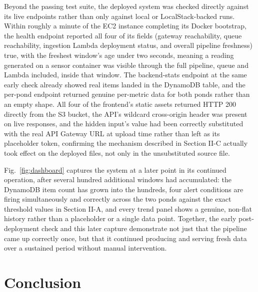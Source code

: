 \documentclass[conference]{IEEEtran}
\begin{document}
Beyond the passing test suite, the deployed system was checked directly against its live endpoints rather than only against local or LocalStack-backed runs. Within roughly a minute of the EC2 instance completing its Docker bootstrap, the health endpoint reported all four of its fields (gateway reachability, queue reachability, ingestion Lambda deployment status, and overall pipeline freshness) true, with the freshest window's age under two seconds, meaning a reading generated on a sensor container was visible through the full pipeline, queue and Lambda included, inside that window. The backend-stats endpoint at the same early check already showed real items landed in the DynamoDB table, and the per-pond endpoint returned genuine per-metric data for both ponds rather than an empty shape. All four of the frontend's static assets returned HTTP 200 directly from the S3 bucket, the API's wildcard cross-origin header was present on live responses, and the hidden input's value had been correctly substituted with the real API Gateway URL at upload time rather than left as its placeholder token, confirming the mechanism described in Section II-C actually took effect on the deployed files, not only in the unsubstituted source file.

Fig.~\ref{fig:dashboard} captures the system at a later point in its continued operation, after several hundred additional windows had accumulated: the DynamoDB item count has grown into the hundreds, four alert conditions are firing simultaneously and correctly across the two ponds against the exact threshold values in Section II-A, and every trend panel shows a genuine, non-flat history rather than a placeholder or a single data point. Together, the early post-deployment check and this later capture demonstrate not just that the pipeline came up correctly once, but that it continued producing and serving fresh data over a sustained period without manual intervention.

\section{Conclusion}
\end{document}
